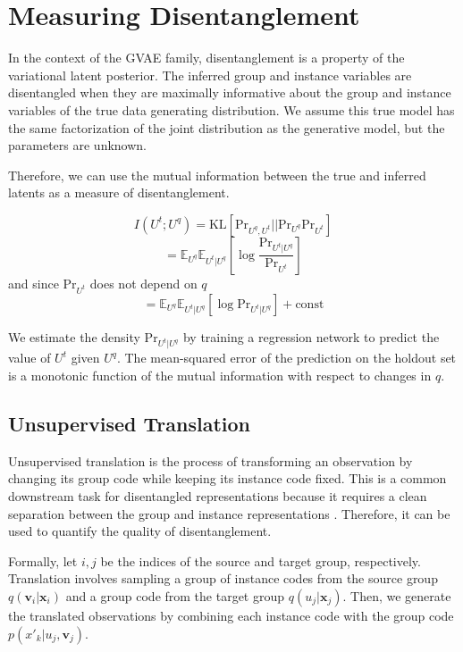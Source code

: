 \documentclass[nohyperref]{article}
\theoremstyle{plain}
\theoremstyle{definition}
\theoremstyle{remark}
\begin{document}
\section{Measuring Disentanglement}

In the context of the GVAE family, disentanglement is a property of the variational latent posterior. The inferred group and instance variables are disentangled when they are maximally informative about the group and instance variables of the true data generating distribution. We assume this true model has the same factorization of the joint distribution as the generative model, but the parameters are unknown.

Therefore, we can use the mutual information between the true and inferred latents as a measure of disentanglement.

$$I(U^t; U^q) = \mathrm{KL} [\mathrm{Pr}_{U^q, U^t} || \mathrm{Pr}_{U^q} \mathrm{Pr}_{U^t}]$$
$$= \mathbb{E}_{U^q} \mathbb{E}_{U^t | U^q} \left[ \log \frac{\mathrm{Pr}_{U^t | U^q}}{\mathrm{Pr}_{U^t}} \right]$$
and since $\mathrm{Pr}_{U^t}$ does not depend on $q$
$$= \mathbb{E}_{U^q} \mathbb{E}_{U^t | U^q} [ \log \mathrm{Pr}_{U^t | U^q}] + \mathrm{const}$$

We estimate the density $\mathrm{Pr}_{U^t | U^q}$ by training a regression network to predict the value of $U^t$ given $U^q$. The mean-squared error of the prediction on the holdout set is a monotonic function of the mutual information with respect to changes in $q$.

\subsection{Unsupervised Translation}

Unsupervised translation is the process of transforming an observation by changing its group code while keeping its instance code fixed. This is a common downstream task for disentangled representations because it requires a clean separation between the group and instance representations \citep{Tenenbaum2000SeparatingSA}. Therefore, it can be used to quantify the quality of disentanglement.

Formally, let $i, j$ be the indices of the source and target group, respectively. Translation involves sampling a group of instance codes from the source group $q(\mathbf{v}_i | \mathbf{x}_i)$ and a group code from the target group $q(u_j | \mathbf{x}_j)$. Then, we generate the translated observations by combining each instance code with the group code $p(x'_{k} | u_j, \mathbf{v}_j)$.
\end{document}
